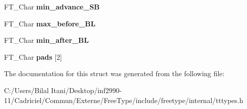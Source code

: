 \begin{DoxyCompactItemize}
\item 
F\+T\+\_\+\+Char {\bfseries min\+\_\+advance\+\_\+\+SB}\hypertarget{struct_t_t___s_bit___line_metrics_rec___ad4f4578a99ce4537bd454bf47a60074c}{}\label{struct_t_t___s_bit___line_metrics_rec___ad4f4578a99ce4537bd454bf47a60074c}

\item 
F\+T\+\_\+\+Char {\bfseries max\+\_\+before\+\_\+\+BL}\hypertarget{struct_t_t___s_bit___line_metrics_rec___a63599b9adfc64d1927b6a8b46d9ce08d}{}\label{struct_t_t___s_bit___line_metrics_rec___a63599b9adfc64d1927b6a8b46d9ce08d}

\item 
F\+T\+\_\+\+Char {\bfseries min\+\_\+after\+\_\+\+BL}\hypertarget{struct_t_t___s_bit___line_metrics_rec___a553dfe17d98fd138430545f4f77195c5}{}\label{struct_t_t___s_bit___line_metrics_rec___a553dfe17d98fd138430545f4f77195c5}

\item 
F\+T\+\_\+\+Char {\bfseries pads} \mbox{[}2\mbox{]}\hypertarget{struct_t_t___s_bit___line_metrics_rec___a9f98e5de39f252b6ebfb3e94120d1dbc}{}\label{struct_t_t___s_bit___line_metrics_rec___a9f98e5de39f252b6ebfb3e94120d1dbc}

\end{DoxyCompactItemize}


The documentation for this struct was generated from the following file\+:\begin{DoxyCompactItemize}
\item 
C\+:/\+Users/\+Bilal Itani/\+Desktop/inf2990-\/11/\+Cadriciel/\+Commun/\+Externe/\+Free\+Type/include/freetype/internal/tttypes.\+h\end{DoxyCompactItemize}
